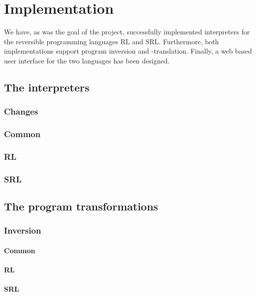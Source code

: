 \chapter*{Implementation}
%

We have, as was the goal of the project, successfully implemented interpreters for the reversible programming languages RL and SRL. Furthermore, both implementations support program inversion and -translation. Finally, a web based user interface for the two languages has been designed.

\section*{The interpreters}
\subsection*{Changes}
\subsection*{Common}
\subsection*{RL}
\subsection*{SRL}

\section*{The program transformations}
\subsection*{Inversion}
\subsubsection*{Common}
\subsubsection*{RL}
\subsubsection*{SRL}

